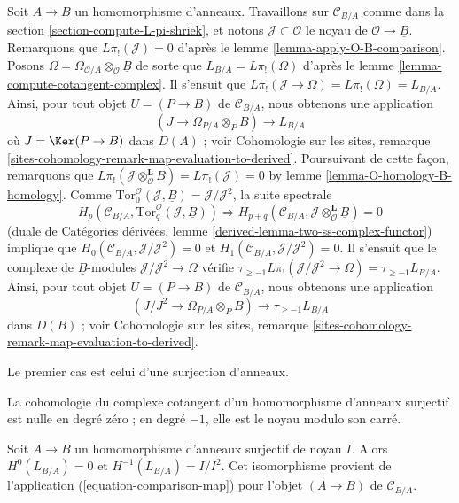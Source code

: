 \begin{remark}
\label{remark-make-map}
Soit $A \to B$ un homomorphisme d'anneaux. Travaillons sur
$\mathcal{C}_{B/A}$ comme dans la section
\ref{section-compute-L-pi-shriek}, et notons
$\mathcal{J} \subset \mathcal{O}$ le noyau de
$\mathcal{O} \to \underline{B}$. Remarquons que
$L\pi_!(\mathcal{J}) = 0$ d'après le lemme
\ref{lemma-apply-O-B-comparison}. Posons
$\Omega =  \Omega_{\mathcal{O}/A} \otimes_\mathcal{O} \underline{B}$
de sorte que
$L_{B/A} = L\pi_!(\Omega)$ d'après le lemme
\ref{lemma-compute-cotangent-complex}. Il s'ensuit que
$L\pi_!(\mathcal{J} \to \Omega) = L\pi_!(\Omega) = L_{B/A}$. Ainsi, pour tout
objet $U = (P \to B)$ de $\mathcal{C}_{B/A}$, nous obtenons une application
\begin{equation}
\label{equation-comparison-map-A}
(J \to \Omega_{P/A} \otimes_P B) \longrightarrow L_{B/A}
\end{equation}
où $J = \Ker(P \to B)$ dans $D(A)$ ; voir Cohomologie sur les sites, remarque
\ref{sites-cohomology-remark-map-evaluation-to-derived}. Poursuivant de cette
façon, remarquons que
$L\pi_!(\mathcal{J} \otimes_\mathcal{O}^\mathbf{L} \underline{B}) =
L\pi_!(\mathcal{J}) = 0$ by
lemme \ref{lemma-O-homology-B-homology}.
Comme $\text{Tor}_0^\mathcal{O}(\mathcal{J}, \underline{B}) =
\mathcal{J}/\mathcal{J}^2$, la suite spectrale
$$
H_p(\mathcal{C}_{B/A}, \text{Tor}_q^\mathcal{O}(\mathcal{J}, \underline{B}))
\Rightarrow 
H_{p + q}(\mathcal{C}_{B/A},
\mathcal{J} \otimes_\mathcal{O}^\mathbf{L} \underline{B}) = 0
$$
(duale de Catégories dérivées, lemme
\ref{derived-lemma-two-ss-complex-functor}) implique que
$H_0(\mathcal{C}_{B/A}, \mathcal{J}/\mathcal{J}^2) = 0$
et $H_1(\mathcal{C}_{B/A}, \mathcal{J}/\mathcal{J}^2) = 0$.
Il s'ensuit que le complexe de $\underline{B}$-modules
$\mathcal{J}/\mathcal{J}^2 \to \Omega$ vérifie
$\tau_{\geq -1}L\pi_!(\mathcal{J}/\mathcal{J}^2 \to \Omega) =
\tau_{\geq -1}L_{B/A}$.
Ainsi, pour tout objet $U = (P \to B)$ de $\mathcal{C}_{B/A}$, nous obtenons
une application
\begin{equation}
\label{equation-comparison-map}
(J/J^2 \to \Omega_{P/A} \otimes_P B) \longrightarrow \tau_{\geq -1}L_{B/A}
\end{equation}
dans $D(B)$ ; voir Cohomologie sur les sites, remarque
\ref{sites-cohomology-remark-map-evaluation-to-derived}.
\end{remark}

\noindent
Le premier cas est celui d'une surjection d'anneaux.

\begin{lemma}
\label{lemma-surjection}
\begin{slogan}
La cohomologie du complexe cotangent d'un homomorphisme d'anneaux surjectif est
nulle en degré zéro ; en degré $-1$, elle est le noyau modulo son carré.
\end{slogan}
Soit $A \to B$ un homomorphisme d'anneaux surjectif de noyau $I$. Alors
$H^0(L_{B/A}) = 0$ et $H^{-1}(L_{B/A}) = I/I^2$. Cet isomorphisme provient de
l'application (\ref{equation-comparison-map}) pour l'objet $(A \to B)$ de
$\mathcal{C}_{B/A}$.
\end{lemma}

